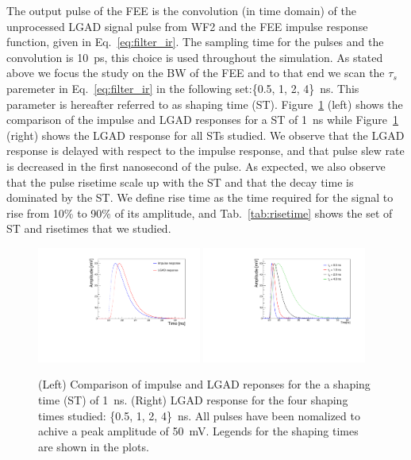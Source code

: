 \documentclass[preprint,1p]{elsarticle}
\begin{document}
The output pulse of the FEE is the convolution (in time domain) of the
unprocessed LGAD signal pulse from WF2 and the FEE impulse response function,
given in Eq.~\ref{eq:filter_ir}. The sampling time for the pulses and the
convolution is 10~\si{ps}, this choice is used throughout the
simulation. As stated above we focus the study on the BW of the FEE and to that
end we scan the $\tau_{s}$ paremeter in Eq.~\ref{eq:filter_ir} in the following
set:\{0.5, 1, 2, 4\}~\si{ns}. This parameter is hereafter referred to as shaping
time (ST). Figure~\ref{fig:ir_and_lgad} (left) shows the comparison of the
impulse and LGAD responses for a ST of 1~\si{ns} while
Figure~\ref{fig:ir_and_lgad} (right) shows the LGAD response for all STs
studied. We observe that the LGAD response is delayed with respect to the
impulse response,  and that pulse slew rate is decreased in the first nanosecond
of the pulse. As expected, we also observe that the pulse risetime scale up with
the ST and that the decay time is dominated by the ST. We define rise time
as the time required for the signal to rise from 10\% to 90\% of its
amplitude, and Tab.~\ref{tab:risetime} shows the set of ST and risetimes that we studied. %


\begin{figure}[htbp]
  \centering
  \includegraphics[width=0.48\textwidth]{figs/impulse_vs_lgad_response_1ns_shaping.pdf} \hfill
  \includegraphics[width=0.48\textwidth]{figs/lgad_all_shaping_time_noiseless.pdf}
  \caption{(Left) Comparison of impulse and LGAD reponses for the a shaping time (ST) of 1~\si{ns}.
  (Right) LGAD response for the four shaping times studied: \{0.5, 1, 2, 4\}~\si{ns}. All pulses have been nomalized
  to achive a peak amplitude of 50~\si{mV}. Legends for the shaping times are shown in the plots.}
  \label{fig:ir_and_lgad}
\end{figure}
\end{document}

